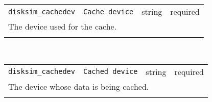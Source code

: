 \noindent 
\begin{tabular}{|p{\lpmodwidth}|p{\lpnamewidth}|p{0.5in}|p{0.5in}|}
\cline{1-4}
\texttt{disksim\_cachedev} & \texttt{Cache device} & string & required \\ 
\cline{1-4}
\multicolumn{4}{|p{6in}|}{
The device used for the cache.
}\\ 
\cline{1-4}
\multicolumn{4}{p{5in}}{}\\
\end{tabular}\\ 
\noindent 
\begin{tabular}{|p{\lpmodwidth}|p{\lpnamewidth}|p{0.5in}|p{0.5in}|}
\cline{1-4}
\texttt{disksim\_cachedev} & \texttt{Cached device} & string & required \\ 
\cline{1-4}
\multicolumn{4}{|p{6in}|}{
The device whose data is being cached.
}\\ 
\cline{1-4}
\multicolumn{4}{p{5in}}{}\\
\end{tabular}\\ 
